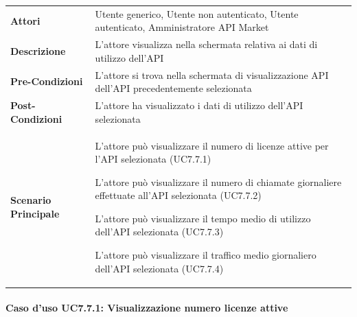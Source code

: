 \begin{minipage}{\linewidth}
	\begin{tabular}{ l | p{11cm}}
		\hline
		\rowcolor{Gray}
		\multicolumn{2}{c}{UC7.7 - Visualizzazione dati di utilizzo API} \\
		\hline
		\textbf{Attori} & Utente generico, Utente non autenticato, Utente autenticato, Amministratore API Market \\
		\textbf{Descrizione} & L'attore visualizza nella schermata relativa ai dati di utilizzo dell'API \\
		\textbf{Pre-Condizioni} & L'attore si trova nella schermata di visualizzazione API dell'API precedentemente selezionata \\
		\textbf{Post-Condizioni} & L'attore ha visualizzato i dati di utilizzo dell'API selezionata \\
		\textbf{Scenario Principale} & 
		\begin{enumerate*}[label=(\arabic*.),itemjoin={\newline}]
			\item L'attore può visualizzare il numero di licenze attive per l'API selezionata (UC7.7.1)
			\item L'attore può visualizzare il numero di chiamate giornaliere effettuate all'API selezionata (UC7.7.2)
			\item L'attore può visualizzare il tempo medio di utilizzo dell'API selezionata (UC7.7.3)
			\item L'attore può visualizzare il traffico medio giornaliero dell'API selezionata (UC7.7.4)
		\end{enumerate*}\\
	\end{tabular}
\end{minipage}

\paragraph{Caso d'uso UC7.7.1: Visualizzazione numero licenze attive}
\label{UC7_7.1}

